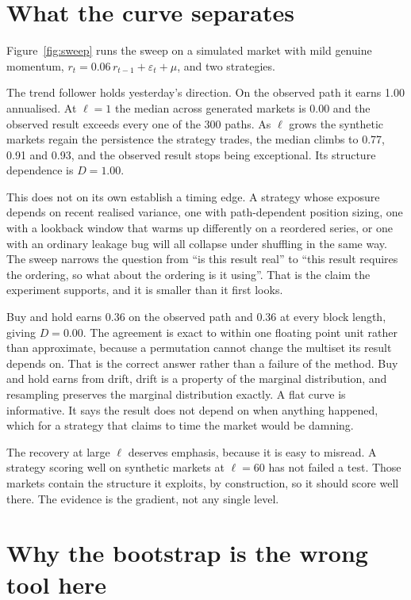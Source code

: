\documentclass[11pt]{article}
\begin{document}
\section{What the curve separates}

Figure~\ref{fig:sweep} runs the sweep on a simulated market with mild genuine momentum, $r_t = 0.06\,r_{t-1} + \varepsilon_t + \mu$, and two strategies.

The trend follower holds yesterday's direction. On the observed path it earns 1.00 annualised. At $\ell = 1$ the median across generated markets is 0.00 and the observed result exceeds every one of the 300 paths. As $\ell$ grows the synthetic markets regain the persistence the strategy trades, the median climbs to 0.77, 0.91 and 0.93, and the observed result stops being exceptional. Its structure dependence is $D = 1.00$.

This does not on its own establish a timing edge. A strategy whose exposure depends on recent realised variance, one with path-dependent position sizing, one with a lookback window that warms up differently on a reordered series, or one with an ordinary leakage bug will all collapse under shuffling in the same way. The sweep narrows the question from ``is this result real'' to ``this result requires the ordering, so what about the ordering is it using''. That is the claim the experiment supports, and it is smaller than it first looks.

Buy and hold earns 0.36 on the observed path and 0.36 at every block length, giving $D = 0.00$. The agreement is exact to within one floating point unit rather than approximate, because a permutation cannot change the multiset its result depends on. That is the correct answer rather than a failure of the method. Buy and hold earns from drift, drift is a property of the marginal distribution, and resampling preserves the marginal distribution exactly. A flat curve is informative. It says the result does not depend on when anything happened, which for a strategy that claims to time the market would be damning.

The recovery at large $\ell$ deserves emphasis, because it is easy to misread. A strategy scoring well on synthetic markets at $\ell = 60$ has not failed a test. Those markets contain the structure it exploits, by construction, so it should score well there. The evidence is the gradient, not any single level.

\section{Why the bootstrap is the wrong tool here}
\end{document}

